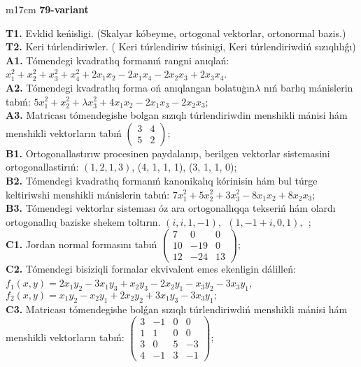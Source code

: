 \documentclass{article}
\begin{document}
\begin{tabular}{m{17cm}}
\textbf{79-variant}
\newline

\textbf{T1.} Evklid keńisligi. (Skalyar kóbeyme, ortogonal vektorlar, ortonormal bazis.) \\
\textbf{T2.} Keri túrlendiriwler. ( Keri túrlendiriw túsinigi,   Keri túrlendiriwdiń sızıqlılıǵı) \\
\textbf{A1.} Tómendegi kvadratlıq formanıń rangni anıqlań: \(x_{1}^{2} + x_{2}^{2} + x_{3}^{2} + x_{4}^{2} + 2x_{1}x_{2} - 2x_{1}x_{4} - 2x_{2}x_{3} + 2x_{3}x_{4}\). \\
\textbf{A2.} Tómendegi kvadratlıq forma oń anıqlangan bolatuģın\(\lambda\) nıń barlıq mánislerin tabıń: \(5x_{1}^{2} + x_{2}^{2} + \lambda x_{3}^{2} + 4x_{1}x_{2} - 2x_{1}x_{3} - 2x_{2}x_{3}\); \\
\textbf{A3.} Matricası tómendegishe bolgan sızıqlı túrlendiriwdin menshikli mánisi hám menshikli vektorların tabıń \(\begin{pmatrix} 3 & 4 \\ 5 & 2 \end{pmatrix}\); \\
\textbf{B1.} Ortogonallastırıw procesinen paydalanıp, berilgen vektorlar sistemasini ortogonallastirıń: \((1,2,1,3)\), (4, 1, 1, 1), (3, 1, 1, 0); \\
\textbf{B2.} Tómendegi kvadratlıq formanıń kanonikalıq kórinisin hám bul túrge keltiriwshi menshikli mánislerin tabıń: \(7x_{1}^{2} + 5x_{2}^{2} + 3x_{3}^{2} - 8x_{1}x_{2} + 8x_{2}x_{3}\); \\
\textbf{B3.} Tómendegi vektorlar sisteması óz ara ortogonallıqqa tekseriń hám olardı ortogonallıq baziske shekem toltırın. \((i,i,1, - 1),\ \ (1, - 1 + i,0,1),\ \ \); \\
\textbf{C1.} Jordan normal formasını tabıń \(\begin{pmatrix} 7 & 0 & 0 \\ 10 & - 19 & 0 \\ 12 & - 24 & 13 \end{pmatrix}\); \\
\textbf{C2.} Tómendegi bisiziqli formalar ekvivalent emes ekenligin dálilleń:\(f_{1}(x,y) = 2x_{1}y_{2} - 3x_{1}y_{3} + x_{2}y_{3} - 2x_{2}y_{1} - x_{3}y_{2} - 3x_{3}y_{1}\),\(f_{2}(x,y) = x_{1}y_{2} - x_{2}y_{1} + 2x_{2}y_{2} + 3x_{1}y_{3} - 3x_{3}y_{1};\) \\
\textbf{C3.} Matricası tómendegishe bolǵan sızıqlı túrlendiriwdiń menshikli mánisi hám menshikli vektorların tabıń: \(\begin{pmatrix} 3 & - 1 & 0 & 0 \\ 1 & 1 & 0 & 0 \\ 3 & 0 & 5 & - 3 \\ 4 & - 1 & 3 & - 1 \end{pmatrix}\); \\

\end{tabular}
\vspace{1cm}
\end{document}
